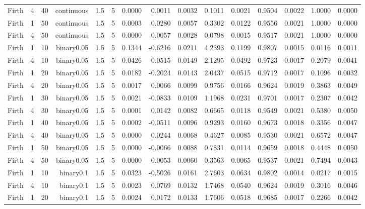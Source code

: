 \begin{longtable}{rrrrrrrrrrrrrrr}
  Firth & 4 & 40 & continuous & 1.5 & 5 & 0.0000 & 0.0011 & 0.0032 & 0.1011 & 0.0021 & 0.9504 & 0.0022 & 1.0000 & 0.0000 \\ 
  Firth & 1 & 50 & continuous & 1.5 & 5 & 0.0003 & 0.0280 & 0.0057 & 0.3302 & 0.0122 & 0.9556 & 0.0021 & 1.0000 & 0.0000 \\ 
  Firth & 4 & 50 & continuous & 1.5 & 5 & 0.0000 & 0.0057 & 0.0028 & 0.0798 & 0.0015 & 0.9517 & 0.0021 & 1.0000 & 0.0000 \\ 
  Firth & 1 & 10 & binary0.05 & 1.5 & 5 & 0.1344 & -0.6216 & 0.0211 & 4.2393 & 0.1199 & 0.9807 & 0.0015 & 0.0116 & 0.0011 \\ 
  Firth & 4 & 10 & binary0.05 & 1.5 & 5 & 0.0426 & 0.0515 & 0.0149 & 2.1295 & 0.0492 & 0.9723 & 0.0017 & 0.2079 & 0.0041 \\ 
  Firth & 1 & 20 & binary0.05 & 1.5 & 5 & 0.0182 & -0.2024 & 0.0143 & 2.0437 & 0.0515 & 0.9712 & 0.0017 & 0.1096 & 0.0032 \\ 
  Firth & 4 & 20 & binary0.05 & 1.5 & 5 & 0.0017 & 0.0066 & 0.0099 & 0.9756 & 0.0166 & 0.9624 & 0.0019 & 0.3863 & 0.0049 \\ 
  Firth & 1 & 30 & binary0.05 & 1.5 & 5 & 0.0021 & -0.0833 & 0.0109 & 1.1968 & 0.0231 & 0.9701 & 0.0017 & 0.2307 & 0.0042 \\ 
  Firth & 4 & 30 & binary0.05 & 1.5 & 5 & 0.0001 & 0.0142 & 0.0082 & 0.6665 & 0.0118 & 0.9549 & 0.0021 & 0.5380 & 0.0050 \\ 
  Firth & 1 & 40 & binary0.05 & 1.5 & 5 & 0.0002 & -0.0511 & 0.0096 & 0.9293 & 0.0160 & 0.9673 & 0.0018 & 0.3356 & 0.0047 \\ 
  Firth & 4 & 40 & binary0.05 & 1.5 & 5 & 0.0000 & 0.0244 & 0.0068 & 0.4627 & 0.0085 & 0.9530 & 0.0021 & 0.6572 & 0.0047 \\ 
  Firth & 1 & 50 & binary0.05 & 1.5 & 5 & 0.0000 & -0.0066 & 0.0088 & 0.7831 & 0.0114 & 0.9659 & 0.0018 & 0.4448 & 0.0050 \\ 
  Firth & 4 & 50 & binary0.05 & 1.5 & 5 & 0.0000 & 0.0053 & 0.0060 & 0.3563 & 0.0065 & 0.9537 & 0.0021 & 0.7494 & 0.0043 \\ 
  Firth & 1 & 10 & binary0.1 & 1.5 & 5 & 0.0323 & -0.5026 & 0.0161 & 2.7603 & 0.0634 & 0.9802 & 0.0014 & 0.0217 & 0.0015 \\ 
  Firth & 4 & 10 & binary0.1 & 1.5 & 5 & 0.0023 & 0.0769 & 0.0132 & 1.7468 & 0.0540 & 0.9624 & 0.0019 & 0.3016 & 0.0046 \\ 
  Firth & 1 & 20 & binary0.1 & 1.5 & 5 & 0.0024 & 0.0172 & 0.0133 & 1.7606 & 0.0518 & 0.9685 & 0.0017 & 0.2266 & 0.0042 \\ 

\end{longtable}
